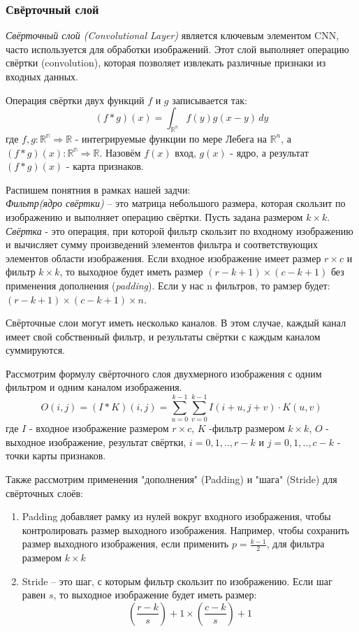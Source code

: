 \subsubsection{Свёрточный слой}
\par \textit{Свёрточный слой (Convolutional Layer)} является ключевым элементом CNN, часто используется для обработки изображений. Этот слой выполняет операцию свёртки (convolution), которая позволяет извлекать различные признаки из входных данных.
\par Операция свёртки двух функций $f$ и $g$ записывается так:
\begin{equation}
	(f*g)(x) = \int_{\mathbb{R^n}}^{} f(y)g(x-y)\,dy
\end{equation}
где $f,g: \mathbb{R^n} \Rightarrow \mathbb{R}$ - интегрируемые функции по мере Лебега на $\mathbb{R}^n$, а $(f*g)(x): \mathbb{R^n} \Rightarrow \mathbb{R}$.
Назовём $f(x)$ вход, $g(x)$ - ядро, а результат $(f*g)(x)$ - карта признаков.
\par Распишем понятния в рамках нашей задчи:\\
\textit{Фильтр(ядро свёртки)} – это матрица небольшого размера, которая скользит по изображению и выполняет операцию свёртки. Пусть задана размером $k \times k$.
\textit{Свёртка} - это операция, при которой фильтр скользит по входному изображению и вычисляет сумму произведений элементов фильтра и соответствующих элементов области изображения. Если входное изображение имеет размер $r \times c$ и фильтр $k \times k$, то выходное будет иметь размер $(r-k+1) \times (c-k+1)$ без применения дополнения (\textit{padding}). Если у нас n фильтров, то рамзер будет: $(r-k+1) \times (c-k+1) \times n$.
\par Свёрточные слои могут иметь несколько каналов. В этом случае, каждый канал имеет свой собственный фильтр, и результаты свёртки с каждым каналом суммируются.
\par Рассмотрим формулу свёрточного слоя двухмерного изображения с одним фильтром и одним каналом изображения. \cite[c. 328-329]{Goodfellow-et-al-2016}
\begin{equation}
	O(i,j) = (I*K)(i,j) = \sum_{u=0}^{k-1}\sum_{v=0}^{k-1}I(i+u, j+v) \cdot K(u,v)
\end{equation}
где $I$ - входное изображение размером $r \times c$, $K$ -фильтр размером $k \times k$, $O$ - выходное изображение, результат свёртки, $i=0,1,.., r-k$ и $j=0,1,.., c-k$ - точки карты признаков.
\par Также рассмотрим применения "дополнения" (Padding) и "шага" (Stride) для свёрточных слоёв:
\begin{enumerate}[]
	\item Padding добавляет рамку из нулей вокруг входного изображения, чтобы контролировать размер выходного изображения. Например, чтобы сохранить размер выходного изображения, если применить $p = \frac{k-1}{2}$, для фильтра размером $k \times k$
	\item Stride – это шаг, с которым фильтр скользит по изображению. Если шаг равен 
	$s$, то выходное изображение будет иметь размер:
	\begin{equation}
		(\frac{r-k}{s}) + 1 \times (\frac{c-k}{s}) + 1 
	\end{equation}
\end{enumerate}

